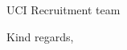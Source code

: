 \documentclass[11pt]{letter}
\begin{document}
\begin{letter}{UCI Recruitment team}
  \closing{Kind regards,}

  
\end{letter}
\end{document}
